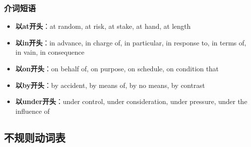 \subsubsection{介词短语}

\begin{itemize}
  \item \textbf{以at开头}：at random, at risk, at stake, at hand, at length
  \item \textbf{以in开头}：in advance, in charge of, in particular, in response to, in terms of, in vain, in consequence
  \item \textbf{以on开头}：on behalf of, on purpose, on schedule, on condition that
  \item \textbf{以by开头}：by accident, by means of, by no means, by contrast
  \item \textbf{以under开头}：under control, under consideration, under pressure, under the influence of
\end{itemize}

\subsection{不规则动词表}

